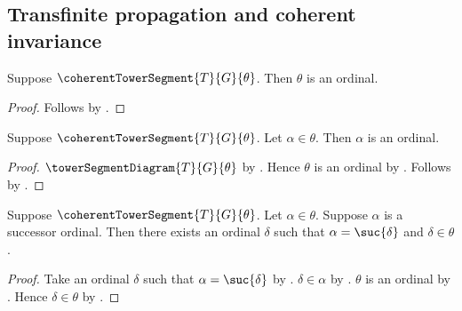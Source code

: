 \subsection{Transfinite propagation and coherent invariance}

\begin{proposition}\label{coherent_tower_length_is_ordinal}
    Suppose $\coherentTowerSegment{T}{G}{\theta}$.
    Then $\theta$ is an ordinal.
\end{proposition}
\begin{proof}
    Follows by
        .
\end{proof}

\begin{proposition}\label{coherent_tower_index_is_ordinal}
    Suppose $\coherentTowerSegment{T}{G}{\theta}$.
    Let $\alpha\in\theta$.
    Then $\alpha$ is an ordinal.
\end{proposition}
\begin{proof}
    $\towerSegmentDiagram{T}{G}{\theta}$ by
        .
    Hence $\theta$ is an ordinal by
        .
    Follows by .
\end{proof}

\begin{proposition}\label{coherent_tower_successor_predecessor_context}
    Suppose $\coherentTowerSegment{T}{G}{\theta}$.
    Let $\alpha\in\theta$.
    Suppose $\alpha$ is a successor ordinal.
    Then there exists an ordinal $\delta$ such that
        $\alpha=\suc{\delta}$ and $\delta\in\theta$.
\end{proposition}
\begin{proof}
    Take an ordinal $\delta$ such that $\alpha=\suc{\delta}$ by
        .
    $\delta\in\alpha$ by .
    $\theta$ is an ordinal by
        .
    Hence $\delta\in\theta$ by .
\end{proof}


